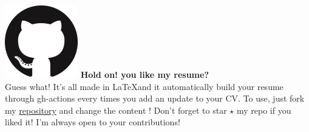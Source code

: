\documentclass[11pt, a4paper, sans]{moderncv}
\begin{document}
    \pagestyle{empty}
    
    
    \hspace{8mm}
    \newline
    \includegraphics[scale=.4]{Images/gh.png}
    \Large{\textbf{Hold on! you like my resume?} \\
    Guess what! It's all made in \LaTeX  and it automatically build your resume through gh-actions every times you add an update to your CV. To use, just fork my \href{https://github.com/Ehsan2754/Resume.git}{\color{blue}repository} and change the content ! Don't forget to star $\star$ my repo if you liked it! I'm always open to your contributions! }
\end{document}
